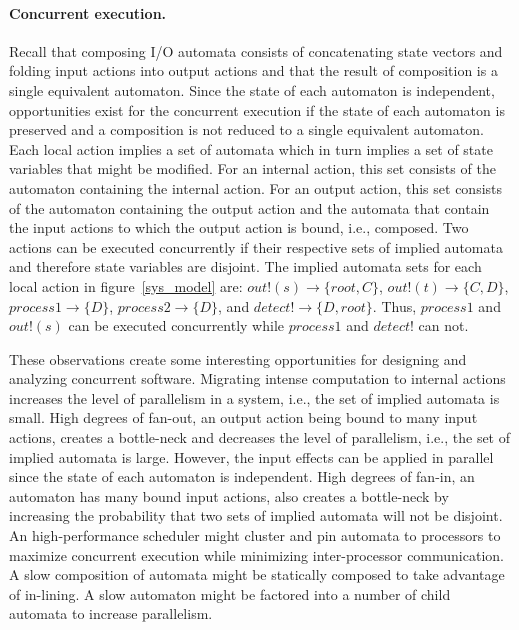 \paragraph{Concurrent execution.}
Recall that composing I/O automata consists of concatenating state vectors and folding input actions into output actions and that the result of composition is a single equivalent automaton.
Since the state of each automaton is independent, opportunities exist for the concurrent execution if the state of each automaton is preserved and a composition is not reduced to a single equivalent automaton.
Each local action implies a set of automata which in turn implies a set of state variables that might be modified.
For an internal action, this set consists of the automaton containing the internal action.
For an output action, this set consists of the automaton containing the output action and the automata that contain the input actions to which the output action is bound, i.e., composed.
Two actions can be executed concurrently if their respective sets of implied automata and therefore state variables are disjoint.
The implied automata sets for each local action in figure~\ref{sys_model} are: $out!(s) \to \{root, C\}$, $out!(t) \to \{C, D\}$, $process1 \to \{D\}$, $process2 \to \{D\}$, and $detect! \to \{D, root\}$.
Thus, $process1$ and $out!(s)$ can be executed concurrently while $process1$ and $detect!$ can not.

These observations create some interesting opportunities for designing and analyzing concurrent software.
Migrating intense computation to internal actions increases the level of parallelism in a system, i.e., the set of implied automata is small.
High degrees of fan-out, an output action being bound to many input actions, creates a bottle-neck and decreases the level of parallelism, i.e., the set of implied automata is large.
However, the input effects can be applied in parallel since the state of each automaton is independent.
High degrees of fan-in, an automaton has many bound input actions, also creates a bottle-neck by increasing the probability that two sets of implied automata will not be disjoint.
An high-performance scheduler might cluster and pin automata to processors to maximize concurrent execution while minimizing inter-processor communication.
A slow composition of automata might be statically composed to take advantage of in-lining.
A slow automaton might be factored into a number of child automata to increase parallelism.

